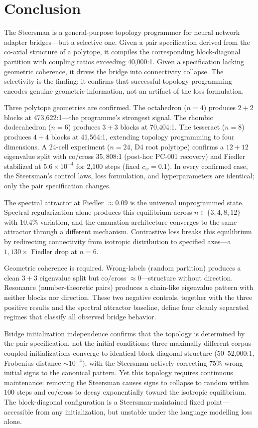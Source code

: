 \section{Conclusion}
\label{sec:conclusion}

The Steersman is a general-purpose topology programmer for neural
network adapter bridges---but a selective one. Given a pair
specification derived from the co-axial structure of a polytope, it
compiles the corresponding block-diagonal partition with coupling ratios
exceeding 40{,}000:1. Given a specification lacking geometric
coherence, it drives the bridge into connectivity collapse. The
selectivity is the finding: it confirms that successful topology
programming encodes genuine geometric information, not an artifact of
the loss formulation.

Three polytope geometries are confirmed. The octahedron ($n{=}4$)
produces $2{+}2$ blocks at 473{,}622:1---the programme's strongest
signal. The rhombic dodecahedron ($n{=}6$) produces $3{+}3$ blocks at
70{,}404:1. The tesseract ($n{=}8$) produces $4{+}4$ blocks at
41{,}564:1, extending topology programming to four dimensions. A
24-cell experiment ($n{=}24$, D4 root polytope) confirms a
$12{+}12$ eigenvalue split with co/cross $35{,}808$:1 (post-hoc
PC-001 recovery) and Fiedler stabilized at $5.6 \times 10^{-4}$
for 2{,}100 steps (fixed $c_w{=}0.1$).
In every
confirmed case, the Steersman's control laws, loss formulation, and
hyperparameters are identical; only the pair specification changes.

The spectral attractor at Fiedler $\approx 0.09$ is the universal
unprogrammed state. Spectral regularization alone produces this
equilibrium across $n \in \{3, 4, 8, 12\}$ with 10.4\% variation, and
the emanation architecture converges to the same attractor through a
different mechanism. Contrastive loss breaks this equilibrium by
redirecting connectivity from isotropic distribution to specified
axes---a $1{,}130\times$ Fiedler drop at $n{=}6$.

Geometric coherence is required. Wrong-labels (random partition)
produces a clean $3{+}3$ eigenvalue split but co/cross
$\approx 0$---structure without direction. Resonance
(number-theoretic pairs) produces a chain-like eigenvalue pattern with
neither blocks nor direction. These two negative controls, together
with the three positive results and the spectral attractor baseline,
define four cleanly separated regimes that classify all observed bridge
behavior.

Bridge initialization independence confirms that the topology is
determined by the pair specification, not the initial conditions:
three maximally different corpus-coupled initializations converge to
identical block-diagonal structure
(50--52{,}000:1, Frobenius distance ${\sim}10^{-4}$), with the
Steersman actively correcting 75\% wrong initial signs to the
canonical pattern. Yet this topology requires continuous maintenance:
removing the Steersman causes signs to collapse to random within 100
steps and co/cross to decay exponentially toward the isotropic
equilibrium. The block-diagonal configuration is a Steersman-maintained
fixed point---accessible from any initialization, but unstable under
the language modelling loss alone.

